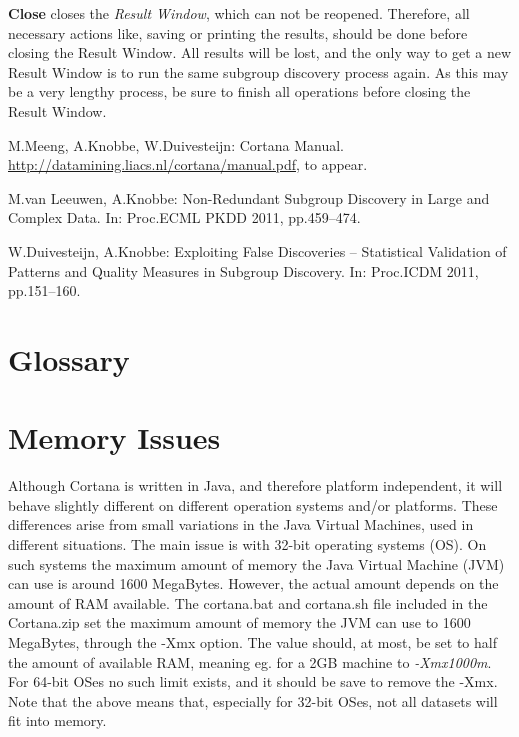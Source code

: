 \documentclass{article}
\begin{document}
\textbf{Close} closes the \emph{Result Window}, which can not be reopened. 
Therefore, all necessary actions like, saving or printing the results,
should be done before closing the Result Window.  All results will be lost,
and the only way to get a new Result Window is to run the same subgroup
discovery process again.  As this may be a very lengthy process, be sure to
finish all operations before closing the Result Window.


\begin{thebibliography}{9}

M.\@ Meeng, A.\@ Knobbe, W.\@ Duivesteijn: Cortana Manual.
\url{http://datamining.liacs.nl/cortana/manual.pdf}, to appear.

M.\@ van Leeuwen, A.\@ Knobbe: Non-Redundant Subgroup Discovery in Large and
Complex Data. In: Proc.\@ ECML PKDD 2011, pp.\@ 459--474.

W.\@ Duivesteijn, A.\@ Knobbe: Exploiting False Discoveries -- Statistical
Validation of Patterns and Quality Measures in Subgroup Discovery. In:
Proc.\@ ICDM 2011, pp.\@ 151--160.

\end{thebibliography}

\appendix
\clearpage


\section{Glossary}
\vspace{-10mm}
\renewcommand*{\glossaryname}{}
\printglossaries


\section{Memory Issues}
\label{sec:memory}

Although Cortana is written in Java, and therefore platform independent, it will behave slightly different on different operation systems and/or platforms.
These differences arise from small variations in the Java Virtual Machines, used in different situations.
The main issue is with 32-bit operating systems (OS).
On such systems the maximum amount of memory the Java Virtual Machine (JVM) can use is around 1600 MegaBytes.
However, the actual amount depends on the amount of RAM available.
The cortana.bat and cortana.sh file included in the Cortana.zip set the maximum amount of memory the JVM can use to 1600 MegaBytes, through the -Xmx option.
The value should, at most, be set to half the amount of available RAM, meaning eg. for a 2GB machine to \emph{-Xmx1000m}.
For 64-bit OSes no such limit exists, and it should be save to remove the -Xmx.
Note that the above means that, especially for 32-bit OSes, not all datasets will fit into memory.
\end{document}
